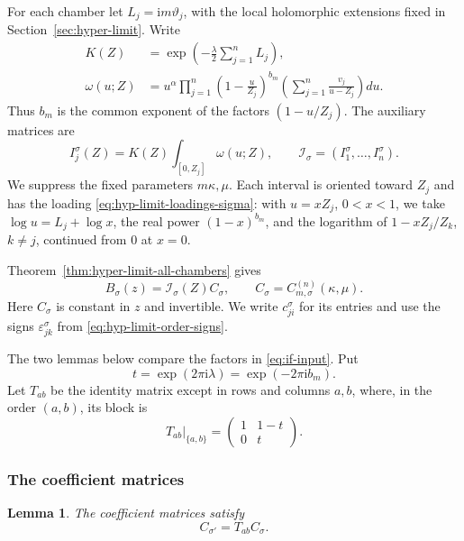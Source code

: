 \documentclass[12pt]{amsart}
\let\sssize\scriptscriptstyle \def\tfrac{\textstyle\frac}
\newtheorem{lem}[thm]{Lemma}
\theoremstyle{definition}
\numberwithin{equation}{section}
\theoremstyle{definition}
\let\mc\mathcal
\let\al\alpha
\let\eps\varepsilon
\let\ka\kappa
\let\la\lambda
\let\si\sigma
\let\om\omega
\def\0{{\sssize0}}
\def\beq{\begin{equation}}
\def\eeq{\end{equation}}
\begin{document}
For each chamber let $L_j=\mathrm{i}m\vartheta_j$, with the
local holomorphic extensions fixed in Section~\ref{sec:hyper-limit}. Write
\beq\label{eq:if-form}
 \begin{aligned}
 K(Z)&=\exp\left(-\frac{\la}{2}\sum_{j=1}^n L_j\right),\\
 \om(u;Z)&=u^\al\prod_{j=1}^n
 \left(1-\frac{u}{Z_j}\right)^{b_m}
 \left(\sum_{j=1}^n\frac{v_j}{u-Z_j}\right)du.
 \end{aligned}
\eeq
Thus $b_m$ is the common exponent of the factors $(1-u/Z_j)$.
The auxiliary matrices are
\beq\label{eq:if-radials}
 I_j^\si(Z)=K(Z)\int_{[0,Z_j]}\om(u;Z),\qquad
 \mc I_\si=(I_1^\si,\ldots,I_n^\si).
\eeq
We suppress the fixed parameters $m\ka,\mu$. Each interval is
oriented toward $Z_j$ and has the loading
\eqref{eq:hyp-limit-loadings-sigma}: with $u=xZ_j$, $0<x<1$,
we take $\log u=L_j+\log x$, the real power $(1-x)^{b_m}$,
and the logarithm of $1-xZ_j/Z_k$, $k\ne j$, continued from
$0$ at $x=0$.

Theorem~\ref{thm:hyper-limit-all-chambers} gives
\beq\label{eq:if-input}
 B_\si(z)=\mc I_\si(Z)C_\si,\qquad
 C_\si=C_{m,\si}^{(n)}(\ka,\mu).
\eeq
Here $C_\si$ is constant in $z$ and invertible. We write
$c_{ji}^\si$ for its entries and use the signs $\eps_{jk}^\si$
from \eqref{eq:hyp-limit-order-signs}.

The two lemmas below compare the factors in \eqref{eq:if-input}.
Put
\beq\label{eq:if-t}
 t=\exp(2\pi\mathrm{i}\la)=\exp(-2\pi\mathrm{i}b_m).
\eeq
Let $T_{ab}$ be the identity matrix except in rows and columns
$a,b$, where, in the order $(a,b)$, its block is
\beq\label{eq:if-block}
 \boxed{T_{ab}\big|_{\{a,b\}}=
 \begin{pmatrix}1&1-t\\0&t\end{pmatrix}.}
\eeq

\subsubsection{The coefficient matrices}

\begin{lem}\label{lem:if-algebra}
The coefficient matrices satisfy
\beq\label{eq:if-algebra}
 C_{\si'}=T_{ab}C_\si.
\eeq
\end{lem}
\end{document}

